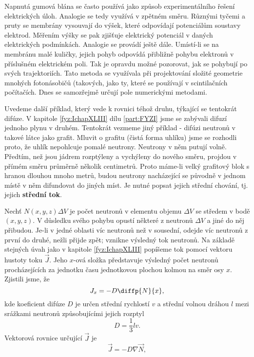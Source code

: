     Napnutá gumová blána se často používá jako způsob experimentálního řešení elektrických úloh.
    Analogie se tedy využívá v zpětném směru. Různými tyčemi a pruty se membrány vysouvají do výšek,
    které odpovídají potenciálům soustavy elektrod. Měřením výšky se pak zjišťuje elektrický
    potenciál v daných elektrických podmínkách. Analogie se provádí ještě dále. Umístí-li se na
    membránu malé kuličky, jejich pohyb odpovídá přibližně pohybu elektronů v příslušném elektrickém
    poli. Tak je opravdu možné pozorovat, jak se  pohybují po svých trajektoriích.
    Tato metoda se využívala při projektování složité geometrie mnohých fotonásobičů (takových, jako
    ty, které se používají v scintilačních počítačích. Dnes se samozřejmě určují pole numerickými
    metodami.

  
    Uvedeme další příklad, který vede k rovnici téhož druhu, týkající se tentokrát difúze. V
    kapitole \ref{fyz:IchapXLIII} dílu \ref{part:FYZI} jsme se zabývali difuzí jednoho plynu v
    druhém. Tentokrát vezmeme jiný příklad - difúzi neutronů v takové látce jako grafit. Mluvit o
    grafitu (čistá forma uhlíku) jsme se rozhodli proto, že uhlík nepohlcuje pomalé neutrony.
    Neutrony v něm putují volně. Předtím, než jsou jádrem rozptýleny a vychýleny do nového směru,
    projdou v přímém směru průměrně několik centimetrů. Proto máme-li velký grafitový blok s hranou
    dlouhou mnoho metrů, budou neutrony nacházející se původně v jednom místě v něm difundovat do
    jiných míst. Je nutné popsat jejich střední chování, tj. jejich \textbf{střední tok}.

    Nechť \(N(x, y, z)\Delta V\) je počet neutronů v elementu objemu \(\Delta V\) se středem v bodě
    \((x, y, z)\). V důsledku svého pohybu opustí některé z neutronů \(\Delta V\) a jiné do něj
    přibudou. Je-li v jedné oblasti víc neutronů než v sousední, odejde víc neutronů z první do
    druhé, nežli přijde zpět; vznikne výsledný tok neutronů. Na základě stejných úvah jako v
    kapitole \ref{fyz:IchapXLIII} popíšeme tok pomocí vektoru hustoty toku \(\vec{J}\). Jeho
    \(x\)-ová složka představuje výsledný počet neutronů procházejících za jednotku času
    jednotkovou plochou kolmou na směr osy \(x\). Zjistili jsme, že
    \begin{equation*}
      J_x = -D\diffp{N}{x},
    \end{equation*} 
    kde koeficient difúze \(D\) je určen střední rychlostí \(v\) a střední volnou dráhou \(l\) mezi
    srážkami neutronů způsobujícími jejich rozptyl
    \begin{equation*}
      D = \frac{1}{3}lv.
    \end{equation*}
    Vektorová rovnice určující \(\vec{J}\) je
    \begin{equation}\label{fyz:eq775}
      \vec{J} = -D\nabla\vec{N},
    \end{equation} 

